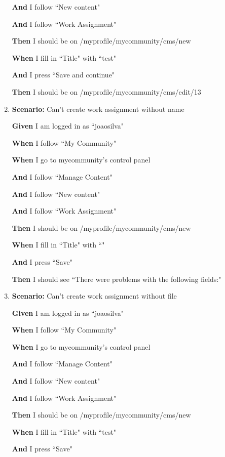 \begin{enumerate}
    \textbf{And} I follow ``New content"
    
    \textbf{And} I follow ``Work Assignment"

    \textbf{Then} I should be on /myprofile/mycommunity/cms/new
    
    \textbf{When} I fill in ``Title" with ``test"
    
    \textbf{And} I press ``Save and continue"
    
    \textbf{Then} I should be on /myprofile/mycommunity/cms/edit/13

 
\item \textbf{Scenario:} Can't create work assignment without name
    
    \textbf{Given}  I am logged in as ``joaosilva" 
    
    \textbf{When} I follow ``My Community"
    
    \textbf{When} I go to mycommunity's control panel
    
    \textbf{And} I follow ``Manage Content"
    
    \textbf{And} I follow ``New content"
    
    \textbf{And} I follow ``Work Assignment"
    
    \textbf{Then} I should be on /myprofile/mycommunity/cms/new
    
    \textbf{When} I fill in ``Title" with ``"
    
    \textbf{And} I press ``Save"
    
    \textbf{Then} I should see ``There were problems with the following fields:"

\item \textbf{Scenario:} Can't create work assignment without file
   
    \textbf{Given} I am logged in as ``joaosilva" 
   
    \textbf{When} I follow ``My Community"
   
    \textbf{When} I go to mycommunity's control panel
   
    \textbf{And} I follow ``Manage Content"
   
    \textbf{And} I follow ``New content"
   
    \textbf{And} I follow ``Work Assignment"
   
    \textbf{Then} I should be on /myprofile/mycommunity/cms/new
   
    \textbf{When} I fill in ``Title" with ``test"
   
    \textbf{And} I press ``Save"
   

\end{enumerate}
